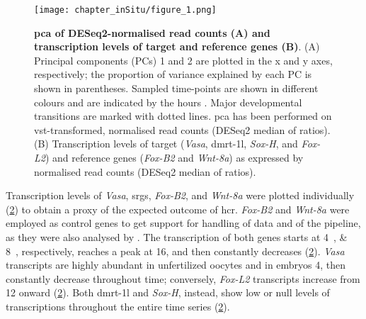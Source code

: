 \begingroup
\captionsetup[figure]{format=hruleformat}
\begin{figure}[t!]
	\centering
	\captionsetup[subfigure]{labelformat=nocaption}
	\begin{subfigure}{0\linewidth}
		\caption{}\label{fig:deseq2-A}
	\end{subfigure}%
	\begin{subfigure}{0\linewidth}
		\caption{}\label{fig:deseq2-B}
	\end{subfigure}%
	\texttt{[image: chapter\_inSitu/figure\_1.png]}
	\caption[\textbf{\gls{pca} of DESeq2-normalised read counts (A) and transcription levels of target and reference genes (B)}]
	{
		\textbf{\gls{pca} of DESeq2-normalised read counts (A) and transcription levels of target and reference genes (B)}. (A) Principal components (PCs) 1 and 2 are plotted in the x and y axes, respectively; the proportion of variance explained by each PC is shown in parentheses. Sampled time-points are shown in different colours and are indicated by the hours . Major developmental transitions are marked with dotted lines. \gls{pca} has been performed on vst-transformed, normalised read counts (DESeq2 median of ratios). (B) Transcription levels of target (\textit{Vasa}, \gls{dmrt-1l}, \textit{Sox-H}, and \textit{Fox-L2}) and reference genes (\textit{Fox-B2} and \textit{Wnt-8a}) as expressed by normalised read counts (DESeq2 median of ratios).
	}
	\label{fig:deseq2}
\end{figure}
\endgroup

Transcription levels of \textit{Vasa}, \glspl{srg}, \textit{Fox-B2}, and \textit{Wnt-8a} were plotted individually (\cref{fig:deseq2-B}) to obtain a proxy of the expected outcome of \gls{hcr}. \textit{Fox-B2} and \textit{Wnt-8a} were employed as control genes to get support for handling of data and of the pipeline, as they were also analysed by . The transcription of both genes starts at \qtylist{4;8}{\hpf}, respectively, reaches a peak at \qty{16}{\hpf}, and then constantly decreases (\cref{fig:deseq2-B}). \textit{Vasa} transcripts are highly abundant in unfertilized oocytes and in embryos \qty{4}{\hpf}, then constantly decrease throughout time; conversely, \textit{Fox-L2} transcripts increase from \qty{12}{\hpf} onward (\cref{fig:deseq2-B}). Both \gls{dmrt-1l} and \textit{Sox-H}, instead, show low or null levels of transcriptions throughout the entire time series (\cref{fig:deseq2-B}).

